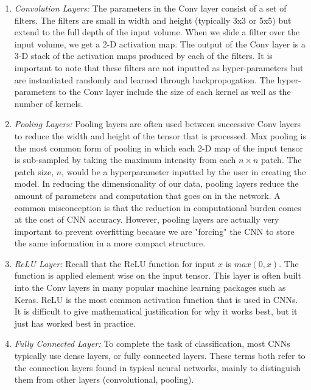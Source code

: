 \documentclass[11pt]{article}
\begin{document}
\begin{enumerate}
    \item \textit{Convolution Layers:} The parameters in the Conv layer consist of a set of filters. The filters are small in width and height (typically 3x3 or 5x5) but extend to the full depth of the input volume. When we slide a filter over the input volume, we get a 2-D activation map. The output of the Conv layer is a 3-D stack of the activation maps produced by each of the filters.  It is important to note that these filters are not inputted as hyper-parameters but are instantiated randomly and learned through backpropogation. The hyper-parameters to the Conv layer include the size of each kernel as well as the number of kernels.
    \item \textit{Pooling Layers:} Pooling layers are often used between successive Conv layers to reduce the width and height of the tensor that is processed. Max pooling is the most common form of pooling in which each 2-D map of the input tensor is sub-sampled by taking the maximum intensity from each $n \times n$ patch. The patch size, $n$, would be a hyperparameter inputted by the user in creating the model. In reducing the dimensionality of our data, pooling layers reduce the amount of parameters and computation that goes on in the network. A common misconception is that the reduction in computational burden comes at the cost of CNN accuracy. However, pooling layers are actually very important to prevent overfitting because we are "forcing" the CNN to store the same information in a more compact structure. 
    \item \textit{ReLU Layer:} Recall that the ReLU function for input $x$ is $max(0,x)$. The function is applied element wise on the input tensor. This layer is often built into the Conv layers in many popular machine learning packages such as Keras. ReLU is the most common activation function that is used in CNNs. It is difficult to give mathematical justification for why it works best, but it just has worked best in practice. 
    \item \textit{Fully Connected Layer:} To complete the task of classification, most CNNs typically use dense layers, or fully connected layers. These terms both refer to the connection layers found in typical neural networks, mainly to distinguish them from other layers (convolutional, pooling).
\end{enumerate}
\end{document}

